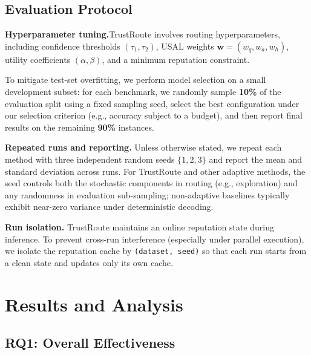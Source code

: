 \documentclass[acmsmall,screen,review,anonymous]{acmart}
\begin{document}
\subsection{Evaluation Protocol}
\label{sec:exp_protocol}
\textbf{Hyperparameter tuning.}TrustRoute involves routing hyperparameters, including confidence thresholds $(\tau_1,\tau_2)$,
USAL weights $\mathbf{w}=(w_q,w_a,w_h)$, utility coefficients $(\alpha,\beta)$, and a minimum reputation constraint.

To mitigate test-set overfitting, we perform model selection on a small development subset:
for each benchmark, we randomly sample \textbf{10\%} of the evaluation split using a fixed sampling seed,
select the best configuration under our selection criterion (e.g., accuracy subject to a budget),
and then report final results on the remaining \textbf{90\%} instances.



\textbf{Repeated runs and reporting.}
Unless otherwise stated, we repeat each method with three independent random seeds
$\{1,2,3\}$ and report the mean and standard deviation across runs.
For TrustRoute and other adaptive methods, the seed controls both the stochastic components in routing
(e.g., exploration) and any randomness in evaluation sub-sampling; non-adaptive baselines typically exhibit
near-zero variance under deterministic decoding.

\textbf{Run isolation.}
TrustRoute maintains an online reputation state during inference.
To prevent cross-run interference (especially under parallel execution), we isolate the reputation cache
by \texttt{(dataset, seed)} so that each run starts from a clean state and updates only its own cache.





\section{Results and Analysis}

\subsection{RQ1: Overall Effectiveness}
\end{document}
